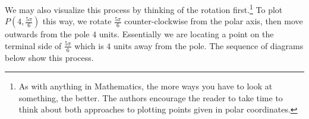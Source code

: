 \documentclass{ximera}
\begin{document}
We may also visualize this process by thinking of the rotation first.\footnote{As with anything in Mathematics, the more ways you have to look at something, the better. The authors encourage the reader to take time to think about both approaches to plotting points given in polar coordinates.}  To plot $P\left(4,\frac{5\pi}{6}\right)$ this way,  we rotate  $\frac{5\pi}{6}$ counter-clockwise from the polar axis, then move outwards from the pole $4$ units.  Essentially we are locating a point on the terminal side of $\frac{5\pi}{6}$ which is $4$ units away from the pole.  The sequence of diagrams below show this process.

\begin{image}
\end{image}
\end{document}
